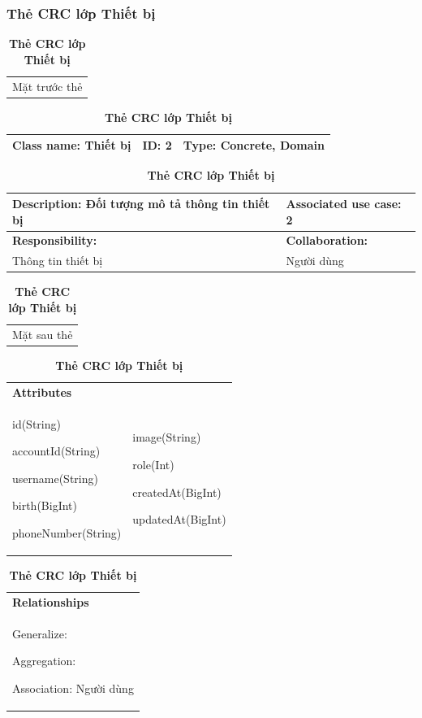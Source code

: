   \subsubsection{Thẻ CRC lớp Thiết bị}
  \begin{table}[H]
    \caption{\bfseries \fontsize{12pt}{0pt}\selectfont Thẻ CRC lớp Thiết bị}
    \centering
    \begin{tabularx}{0.9\textwidth}{X}
      Mặt trước thẻ
    \end{tabularx}
    \begin{tabularx}{0.9\textwidth}{|X|X|X|}
      \hline
      \textbf{Class name:} Thiết bị & \textbf{ID:} 2 & \textbf{Type:} Concrete, Domain \\
      \hline
    \end{tabularx}
    \begin{tabularx}{0.9\textwidth}{|X|X|}
      \textbf{Description:} Đối tượng mô tả thông tin thiết bị & \textbf{Associated use case:} 2 \\
      \hline
      \textbf{Responsibility:} & \textbf{Collaboration:} \\
      Thông tin thiết bị 
      & 
      Người dùng 
      \\
      \hline
    \end{tabularx}
    \begin{tabularx}{0.9\textwidth}{X}
      Mặt sau thẻ
    \end{tabularx}
    \begin{tabularx}{0.9\textwidth}{|X|X|}
      \hline
      \textbf{Attributes} & \\
      id(String) 
      
      accountId(String)

      username(String)

      birth(BigInt)

      phoneNumber(String)
      & 
      image(String) 
      
      role(Int) 
      
      createdAt(BigInt)

      updatedAt(BigInt)
      \\
      \hline
    \end{tabularx}
    \begin{tabularx}{0.9\textwidth}{|X|}
      \textbf{Relationships} \\
      Generalize:  

      Aggregation:  
      
      Association: Người dùng 
      \\
      \hline
    \end{tabularx}
  \end{table}

